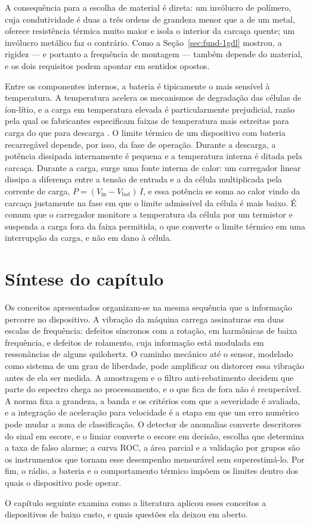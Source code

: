 A consequência para a escolha de material é direta: um invólucro de polímero, cuja
condutividade é duas a três ordens de grandeza menor que a de um metal, oferece resistência
térmica muito maior e isola o interior da carcaça quente; um invólucro metálico faz o
contrário. Como a Seção~\ref{sec:fund-1gdl} mostrou, a rigidez --- e portanto a
frequência de montagem --- também depende do material, e os dois requisitos podem apontar
em sentidos opostos.

Entre os componentes internos, a bateria é tipicamente o mais sensível à temperatura. A
temperatura acelera os mecanismos de degradação das células de íon-lítio, e a carga em
temperatura elevada é particularmente prejudicial, razão pela qual os fabricantes
especificam faixas de temperatura mais estreitas para carga do que para descarga
\cite{ma2018}. O limite térmico de um dispositivo com bateria recarregável depende, por
isso, da fase de operação. Durante a descarga, a potência dissipada internamente é pequena
e a temperatura interna é ditada pela carcaça. Durante a carga, surge uma fonte interna de
calor: um carregador linear dissipa a diferença entre a tensão de entrada e a da célula
multiplicada pela corrente de carga, $P = (V_{\mathrm{in}} - V_{\mathrm{bat}})\,I$, e essa
potência se soma ao calor vindo da carcaça justamente na fase em que o limite admissível da
célula é mais baixo. É comum que o carregador monitore a temperatura da célula por um
termistor e suspenda a carga fora da faixa permitida, o que converte o limite térmico em
uma interrupção da carga, e não em dano à célula.

\section{Síntese do capítulo}
\label{sec:fund-sintese}

Os conceitos apresentados organizam-se na mesma sequência que a informação percorre no
dispositivo. A vibração da máquina carrega assinaturas em duas escalas de frequência:
defeitos síncronos com a rotação, em harmônicas de baixa frequência, e defeitos de
rolamento, cuja informação está modulada em ressonâncias de alguns quilohertz. O caminho
mecânico até o sensor, modelado como sistema de um grau de liberdade, pode amplificar ou
distorcer essa vibração antes de ela ser medida. A amostragem e o filtro anti-rebatimento
decidem que parte do espectro chega ao processamento, e o que fica de fora não é
recuperável. A norma fixa a grandeza, a banda e os critérios com que a severidade é
avaliada, e a integração de aceleração para velocidade é a etapa em que um erro numérico
pode mudar a zona de classificação. O detector de anomalias converte descritores do sinal
em escore, e o limiar converte o escore em decisão, escolha que determina a taxa de falso
alarme; a curva ROC, a área parcial e a validação por grupos são os instrumentos que tornam
esse desempenho mensurável sem superestimá-lo. Por fim, o rádio, a bateria e o
comportamento térmico impõem os limites dentro dos quais o dispositivo pode operar.

O capítulo seguinte examina como a literatura aplicou esses conceitos a dispositivos de
baixo custo, e quais questões ela deixou em aberto.
